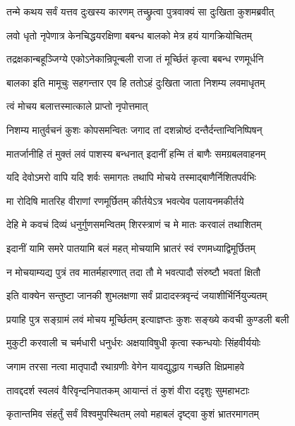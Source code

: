 \twolineshloka
{तन्मे कथय सर्वं यत्तव दुःखस्य कारणम्}
{तच्छ्रुत्वा पुत्रवाक्यं सा दुःखिता कुशमब्रवीत्}%

\twolineshloka
{लवो धृतो नृपेणात्र केनचिद्धयरक्षिणा}
{बबन्ध बालको मेत्र हयं यागक्रियोचितम्}%

\twolineshloka
{तद्रक्षकान्बहूञ्जिग्ये एकोऽनेकान्रिपून्बली}
{राजा तं मूर्च्छितं कृत्वा बबन्ध रणमूर्धनि}%

\twolineshloka
{बालका इति मामूचुः सहगन्तार एव हि}
{ततोऽहं दुःखिता जाता निशम्य लवमाधृतम्}%

त्वं मोचय बलात्तस्मात्काले प्राप्तो नृपोत्तमात्

\twolineshloka
{निशम्य मातुर्वचनं कुशः कोपसमन्वितः}
{जगाद तां दशन्नोष्ठं दन्तैर्दन्तान्विनिष्पिषन्}%


\twolineshloka
{मातर्जानीहि तं मुक्तं लवं पाशस्य बन्धनात्}
{इदानीं हन्मि तं बाणैः समग्रबलवाहनम्}%

\twolineshloka
{यदि देवोऽमरो वापि यदि शर्वः समागतः}
{तथापि मोचये तस्माद्बाणैर्निशितपर्वभिः}%

\twolineshloka
{मा रोदिषि मातरिह वीराणां रणमूर्छितम्}
{कीर्तयेऽत्र भवत्येव पलायनमकीर्तये}%

\twolineshloka
{देहि मे कवचं दिव्यं धनुर्गुणसमन्वितम्}
{शिरस्त्राणं च मे मातः करवालं तथाशितम्}%

\twolineshloka
{इदानीं यामि समरे पातयामि बलं महत्}
{मोचयामि भ्रातरं स्वं रणमध्याद्विमूर्छितम्}%

\twolineshloka
{न मोचयाम्यद्य पुत्रं तव मातर्महारणात्}
{तदा तौ मे भवत्पादौ संरुष्टौ भवतां क्षितौ}%


\twolineshloka
{इति वाक्येन सन्तुष्टा जानकी शुभलक्षणा}
{सर्वं प्रादादस्त्रवृन्दं जयाशीर्भिर्नियुज्यतम्}%

\twolineshloka
{प्रयाहि पुत्र सङ्ग्रामं लवं मोचय मूर्च्छितम्}
{इत्याज्ञप्तः कुशः सङ्ख्ये कवची कुण्डली बली}%

\twolineshloka
{मुकुटी करवाली च चर्मधारी धनुर्धरः}
{अक्षयाविषुधी कृत्वा स्कन्धयोः सिंहवीर्ययोः}%

\twolineshloka
{जगाम तरसा नत्वा मातृपादौ रथाग्रणीः}
{वेगेन यावद्युद्धाय गच्छति क्षिप्रमाहवे}%

\twolineshloka
{तावद्ददर्श स्वलवं वैरिवृन्दनिपातकम्}
{आयान्तं तं कुशं वीरा ददृशुः सुमहाभटाः}%

\twolineshloka
{कृतान्तमिव संहर्तुं सर्वं विश्वमुपस्थितम्}
{लवो महाबलं दृष्ट्वा कुशं भ्रातरमागतम्}%

